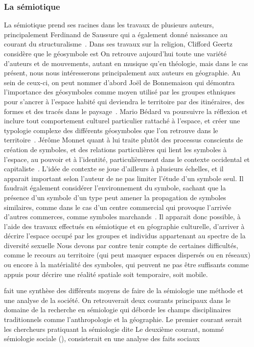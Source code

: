 \subsubsection{La sémiotique}
\label{ssub:la_semiotique}  La sémiotique prend ses racines dans les travaux de plusieurs auteurs, principalement Ferdinand de Saussure qui a également donné naissance au courant du structuralisme~\citep{Noth1995}. 
Dans ses travaux sur la religion, Clifford Geertz considère que le géosymbole est On retrouve aujourd'hui toute une variété d'auteurs et de mouvements, autant en musique qu'en théologie, mais dans le cas présent, nous nous intéresserons principalement aux auteurs en géographie. 
Au sein de ceux-ci, on peut nommer d'abord Joël de Bonnemaison qui démontra l'importance des géosymboles comme moyen utilisé par les groupes ethniques pour s'ancrer à l'espace habité qui deviendra le territoire par des itinéraires, des formes et des tracés dans le paysage~\citep{Bonnemaison1981}. 
Mario Bédard va poursuivre la réflexion et inclure tout comportement culturel particulier rattaché à l'espace, et créer une typologie complexe des différents géosymboles que l'on retrouve dans le territoire~\citep{Bedard2002}. 
Jérôme Monnet quant à lui traite plutôt des processus conscients de création de symboles, et des relations particulières qui lient les symboles à l'espace, au pouvoir et à l'identité, particulièrement dans le contexte occidental et capitaliste~\citep{Monnet1998}. 
L'idée de contexte se joue d'ailleurs à plusieurs échelles, et il apparait important selon l'auteur de ne pas limiter l'étude d'un symbole seul. 
Il faudrait également considérer l'environnement du symbole, sachant que la présence d'un symbole d'un type peut amener la propagation de symboles similaires, comme dans le cas d'un centre commercial qui provoque l'arrivée d'autres commerces, comme symboles marchands~\citep[7-8]{Monnet1998}.
Il apparait donc possible, à l'aide des travaux effectués en sémiotique et en géographie culturelle, d'arriver à décrire l'espace occupé par les groupes et individus appartenant au spectre de la diversité sexuelle
Nous devons par contre tenir compte de certaines difficultés, comme le recours au territoire (qui peut masquer espaces dispersés ou en réseaux) ou encore à la matérialité des symboles, qui peuvent ne pas être suffisants comme appuis pour décrire une réalité spatiale soit temporaire, soit mobile.

\citet[105--109]{Rose2012} fait une synthèse des différents moyens de faire de la sémiologie une méthode et une analyse de la société. 
On retrouverait deux courants principaux dans le domaine de la recherche en sémiologie qui déborde les champs disciplinaires traditionnels comme l'anthropologie et la géographie.
Le premier courant serait les chercheurs pratiquant la sémiologie dite  
Le deuxième courant, nommé sémiologie sociale (), consisterait en une analyse des faits sociaux

